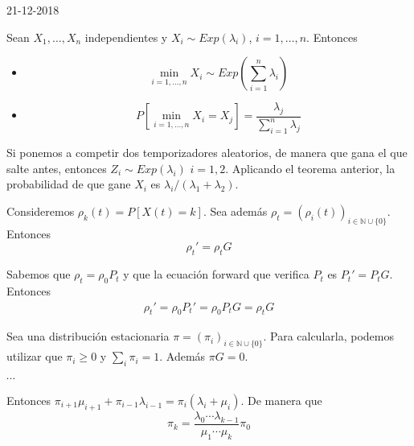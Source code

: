 \documentclass[PREyA.tex]{subfiles}
\begin{document}
\newpage 
\begin{center}
21-12-2018
\end{center}

\begin{theorem}
Sean $X_1,\dotsc,X_n$ independientes y $X_i \sim Exp(\lambda_i)$, $i=1,\dotsc,n$. Entonces
\begin{itemize}
\item 
$$
\min_{i=1,\dotsc,n} X_i  \sim Exp\left(\sum_{i=1}^n\lambda_i\right)
$$
\item
$$
P\left[\min_{i=1,\dotsc,n} X_i = X_j\right] = \frac{\lambda_j}{\sum_{i=1}^n \lambda_j}
$$
\end{itemize}
\end{theorem}
\begin{nota}
Si ponemos a competir dos temporizadores aleatorios, de manera que gana el que salte antes, entonces $Z_i \sim Exp(\lambda_i)$ $i=1,2$. Aplicando el teorema anterior, la probabilidad de que gane $X_i$ es $\lambda_i / (\lambda_1 + \lambda_2)$.
\end{nota}

\begin{prop}
Consideremos $\rho_k(t)= P[X(t)=k]$. Sea además $\rho_t = (\rho_i(t))_{i \in \mathbb{N}\cup\{0\}}$. Entonces
$$
\rho_t'=\rho_t G
$$
\end{prop}
\begin{dem}
Sabemos que $\rho_t = \rho_0 P_t$ y que la ecuación forward que verifica $P_t$ es $P_t' = P_t G$. Entonces
\begin{align*}
\rho_t' = \rho_0P_t' = \rho_0 P_t G = \rho_t G
\end{align*}
\end{dem}

\begin{nota}
Sea una distribución estacionaria $\pi = (\pi_i)_{i \in \mathbb{N}\cup\{0\}}$. Para calcularla, podemos utilizar que $\pi_i\geq 0$ y $\sum_i \pi_i =1$. Además $\pi G = 0$.


\begin{center}
 $\cdots$

\end{center}
Entonces $\pi_{i+1}\mu_{i+1} + \pi_{i-1}\lambda_{i-1} = \pi_i (\lambda_i+\mu_i)$. De manera que
$$
\pi_k = \frac{\lambda_0 \cdots \lambda_{k-1}}{\mu_1 \cdots \mu_k } \pi_0
$$

\end{nota}
\end{document}
